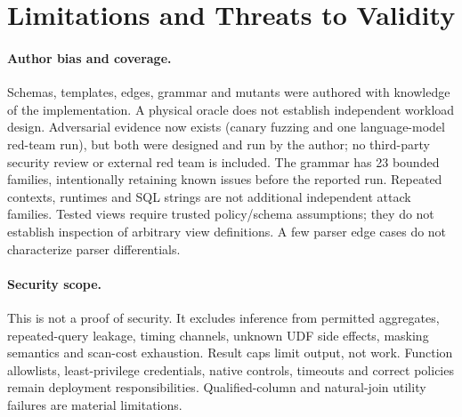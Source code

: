 \documentclass[sigconf,nonacm,natbib=false]{acmart}
\begin{document}
\section{Limitations and Threats to Validity}
\paragraph{Author bias and coverage.}
Schemas, templates, edges, grammar and mutants were authored with knowledge
of the implementation. A physical oracle does not establish independent
workload design. Adversarial evidence now exists (canary fuzzing and one
language-model red-team run), but both were designed and run by the author; no
third-party security review or external red team is included. The grammar has 23 bounded
families, intentionally retaining known issues before the reported run.
Repeated contexts, runtimes and SQL strings are not additional independent
attack families. Tested views require trusted policy/schema assumptions;
they do not establish inspection of arbitrary view definitions. A few parser
edge cases do not characterize parser differentials.

\paragraph{Security scope.}
This is not a proof of security. It excludes inference from permitted
aggregates, repeated-query leakage, timing channels, unknown UDF side
effects, masking semantics and scan-cost exhaustion. Result caps limit output,
not work. Function allowlists, least-privilege credentials, native controls,
timeouts and correct policies remain deployment responsibilities.
Qualified-column and natural-join utility failures are material limitations.
\end{document}
